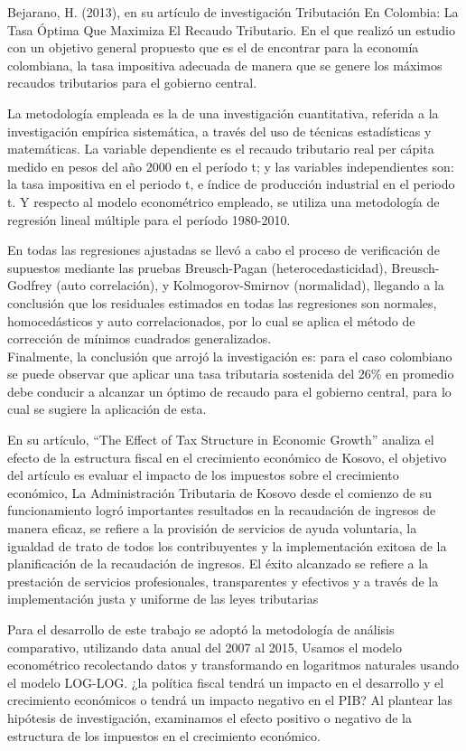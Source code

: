 \documentclass[
  letterpaper,
]{article}
\begin{document}
Bejarano, H. (2013), en su artículo de investigación Tributación En
Colombia: La Tasa Óptima Que Maximiza El Recaudo Tributario. En el que
realizó un estudio con un objetivo general propuesto que es el de
encontrar para la economía colombiana, la tasa impositiva adecuada de
manera que se genere los máximos recaudos tributarios para el gobierno
central.

La metodología empleada es la de una investigación cuantitativa,
referida a la investigación empírica sistemática, a través del uso de
técnicas estadísticas y matemáticas. La variable dependiente es el
recaudo tributario real per cápita medido en pesos del año 2000 en el
período t; y las variables independientes son: la tasa impositiva en el
periodo t, e índice de producción industrial en el periodo t. Y respecto
al modelo econométrico empleado, se utiliza una metodología de regresión
lineal múltiple para el período 1980-2010.

En todas las regresiones ajustadas se llevó a cabo el proceso de
verificación de supuestos mediante las pruebas Breusch-Pagan
(heterocedasticidad), Breusch-Godfrey (auto correlación), y
Kolmogorov-Smirnov (normalidad), llegando a la conclusión que los
residuales estimados en todas las regresiones son normales,
homocedásticos y auto correlacionados, por lo cual se aplica el método
de corrección de mínimos cuadrados generalizados.\\
Finalmente, la conclusión que arrojó la investigación es: para el caso
colombiano se puede observar que aplicar una tasa tributaria sostenida
del 26\% en promedio debe conducir a alcanzar un óptimo de recaudo para
el gobierno central, para lo cual se sugiere la aplicación de esta.

\textcite{gashi_effect_2018} En su artículo, ``The Effect of Tax
Structure in Economic Growth'' analiza el efecto de la estructura fiscal
en el crecimiento económico de Kosovo, el objetivo del artículo es
evaluar el impacto de los impuestos sobre el crecimiento económico, La
Administración Tributaria de Kosovo desde el comienzo de su
funcionamiento logró importantes resultados en la recaudación de
ingresos de manera eficaz, se refiere a la provisión de servicios de
ayuda voluntaria, la igualdad de trato de todos los contribuyentes y la
implementación exitosa de la planificación de la recaudación de
ingresos. El éxito alcanzado se refiere a la prestación de servicios
profesionales, transparentes y efectivos y a través de la implementación
justa y uniforme de las leyes tributarias

Para el desarrollo de este trabajo se adoptó la metodología de análisis
comparativo, utilizando data anual del 2007 al 2015, Usamos el modelo
econométrico recolectando datos y transformando en logaritmos naturales
usando el modelo LOG-LOG. ¿la política fiscal tendrá un impacto en el
desarrollo y el crecimiento económicos o tendrá un impacto negativo en
el PIB? Al plantear las hipótesis de investigación, examinamos el efecto
positivo o negativo de la estructura de los impuestos en el crecimiento
económico.
\end{document}
